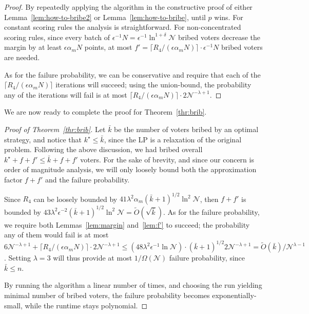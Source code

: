 \documentclass[letterpaper]{article} %
\newtheorem{corollary}[theorem]{Corollary}
\theoremstyle{definition}
\newcommand{\NN}{\mathcal{N}}
\newcommand\vecgreek{\bm}
\newcommand{\veca}{\vecgreek{\alpha}}
\newcommand{\Ra}{\mathcal{R}_{\veca}}
\begin{document}
\begin{proof}
	By repeatedly applying the algorithm in the constructive proof of either  Lemma~\ref{lem:how-to-bribe2} or Lemma~\ref{lem:how-to-bribe}, until $p$ wins. For constant scoring rules the analysis is straightforward. For non-concentrated scoring rules, since every batch of $\epsilon^{-1}N=\epsilon^{-1}\ln^{1+\delta}\NN$ bribed voters decrease the margin by at least $\epsilon \alpha_m N$ points, at most $f'=\lceil R_4/(\epsilon \alpha_m N)\rceil \cdot  \epsilon^{-1}N$ bribed voters are needed.

	As for the failure probability, we can be conservative and require that each of the $\lceil R_4/(\epsilon \alpha_m N)\rceil $ iterations will succeed; using the union-bound, the probability any of the iterations will fail is at most $\lceil R_4/(\epsilon \alpha_m N)\rceil \cdot 2\NN^{-\lambda+1}$.
\end{proof}
We are now ready to complete the proof for Theorem~\ref{thr:brib}.
\begin{proof}[Proof of Theorem~\ref{thr:brib}]
	Let $\bar{k}$ be the number of voters bribed by an optimal strategy, and notice that $k^\star \leq \bar{k}$, since the LP is a relaxation of the original problem.
	Following  the above discussion, we had bribed overall $k^\star +f+f' \leq \bar{k} +f+f'$ voters. For the sake of brevity, and since our concern is order of magnitude analysis, we will only loosely bound both the approximation factor $f+f'$ and the failure probability.

	Since $R_4$ can be loosely bounded by $41\lambda^2 \alpha_m  (\bar{k}+1)^{1/2}\ln^2 \NN $, then
	$f+f'$ is bounded by $43\lambda^2 \epsilon^{-2} (\bar{k}+1)^{1/2} \ln^2 \NN = \widetilde{O}(\sqrt{\bar{k}})$. As for the failure probability, we require both Lemmas~\ref{lem:margin} and~\ref{lem:f'} to succeed; the probability any of them would fail is at most $6\NN^{-\lambda+1}+\lceil R_4/(\epsilon \alpha_m N)\rceil \cdot 2\NN^{-\lambda+1} \leq (48\lambda^2 \epsilon^{-1} \ln \NN) \cdot (\bar{k}+1)^{1/2}  2\NN^{-\lambda+1}=\widetilde{O}(\bar{k})/\NN^{\lambda-1}$. Setting $\lambda=3$ will thus provide at most $1/\Omega(\NN)$ failure probability, since $\bar{k} \leq n$.

	By running the algorithm a linear number of times, and choosing the run yielding minimal number of bribed voters, the failure probability becomes exponentially-small, while the runtime stays polynomial.
\end{proof}
\end{document}
